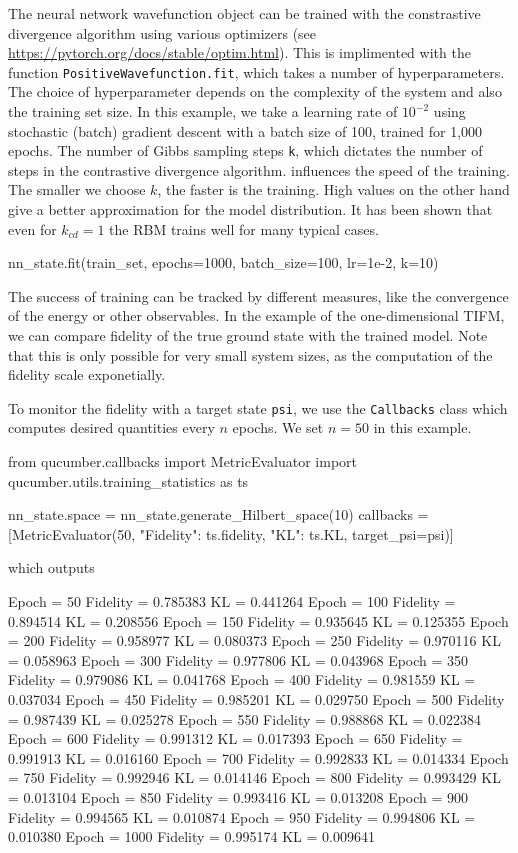 \documentclass[submission, Phys]{SciPost}
\begin{document}
The neural network wavefunction object can be trained with the constrastive divergence algorithm using various optimizers (see \url{https://pytorch.org/docs/stable/optim.html}).
This is implimented with the function \verb|PositiveWavefunction.fit|, which takes a number of hyperparameters.
The choice of hyperparameter depends on the complexity of the system and also the training set size.
In this example, we take a learning rate of $10^{-2}$ using stochastic (batch) gradient descent with a batch size of 100, trained for 1,000 epochs.
The number of Gibbs sampling steps \verb|k|, which dictates the number of steps in the contrastive divergence algorithm.
influences the speed of the training. The smaller we choose $k$, the faster is the training. High values on the other hand give a better approximation for the model distribution. It has been shown that even for $k_{cd}=1$ the RBM trains well for many typical cases\cite{hinton2002training}.

\begin{python}
	nn_state.fit(train_set, epochs=1000, batch_size=100, lr=1e-2, k=10)
\end{python}

The success of training can be tracked by different measures, like the convergence of the energy or other observables.
In the example of the one-dimensional TIFM, we can compare fidelity of the true ground state with the trained model.
Note that this is only possible for very small system sizes, as the computation of the fidelity scale exponetially.

To monitor the fidelity with a target state \verb|psi|, we use the \verb|Callbacks| class which computes desired quantities every $n$ epochs.
We set $n=50$ in this example.

\begin{python}
	from qucumber.callbacks import MetricEvaluator
	import qucumber.utils.training_statistics as ts

	nn_state.space = nn_state.generate_Hilbert_space(10)
	callbacks = [MetricEvaluator(50, {"Fidelity": ts.fidelity, "KL": ts.KL},
	target_psi=psi)]
\end{python}
which outputs
\begin{python}
	Epoch = 50	Fidelity = 0.785383	KL = 0.441264
	Epoch = 100	Fidelity = 0.894514	KL = 0.208556
	Epoch = 150	Fidelity = 0.935645	KL = 0.125355
	Epoch = 200	Fidelity = 0.958977	KL = 0.080373
	Epoch = 250	Fidelity = 0.970116	KL = 0.058963
	Epoch = 300	Fidelity = 0.977806	KL = 0.043968
	Epoch = 350	Fidelity = 0.979086	KL = 0.041768
	Epoch = 400	Fidelity = 0.981559	KL = 0.037034
	Epoch = 450	Fidelity = 0.985201	KL = 0.029750
	Epoch = 500	Fidelity = 0.987439	KL = 0.025278
	Epoch = 550	Fidelity = 0.988868	KL = 0.022384
	Epoch = 600	Fidelity = 0.991312	KL = 0.017393
	Epoch = 650	Fidelity = 0.991913	KL = 0.016160
	Epoch = 700	Fidelity = 0.992833	KL = 0.014334
	Epoch = 750	Fidelity = 0.992946	KL = 0.014146
	Epoch = 800	Fidelity = 0.993429	KL = 0.013104
	Epoch = 850	Fidelity = 0.993416	KL = 0.013208
	Epoch = 900	Fidelity = 0.994565	KL = 0.010874
	Epoch = 950	Fidelity = 0.994806	KL = 0.010380
	Epoch = 1000	Fidelity = 0.995174	KL = 0.009641
\end{python}
\end{document}

